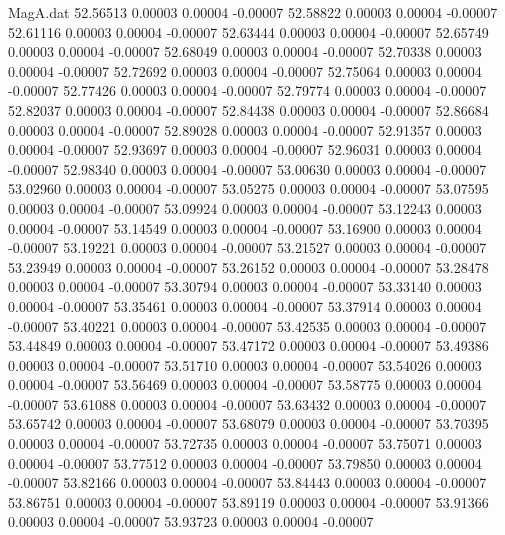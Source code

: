 \begin{filecontents}{MagA.dat}
  52.56513    0.00003    0.00004   -0.00007
  52.58822    0.00003    0.00004   -0.00007
  52.61116    0.00003    0.00004   -0.00007
  52.63444    0.00003    0.00004   -0.00007
  52.65749    0.00003    0.00004   -0.00007
  52.68049    0.00003    0.00004   -0.00007
  52.70338    0.00003    0.00004   -0.00007
  52.72692    0.00003    0.00004   -0.00007
  52.75064    0.00003    0.00004   -0.00007
  52.77426    0.00003    0.00004   -0.00007
  52.79774    0.00003    0.00004   -0.00007
  52.82037    0.00003    0.00004   -0.00007
  52.84438    0.00003    0.00004   -0.00007
  52.86684    0.00003    0.00004   -0.00007
  52.89028    0.00003    0.00004   -0.00007
  52.91357    0.00003    0.00004   -0.00007
  52.93697    0.00003    0.00004   -0.00007
  52.96031    0.00003    0.00004   -0.00007
  52.98340    0.00003    0.00004   -0.00007
  53.00630    0.00003    0.00004   -0.00007
  53.02960    0.00003    0.00004   -0.00007
  53.05275    0.00003    0.00004   -0.00007
  53.07595    0.00003    0.00004   -0.00007
  53.09924    0.00003    0.00004   -0.00007
  53.12243    0.00003    0.00004   -0.00007
  53.14549    0.00003    0.00004   -0.00007
  53.16900    0.00003    0.00004   -0.00007
  53.19221    0.00003    0.00004   -0.00007
  53.21527    0.00003    0.00004   -0.00007
  53.23949    0.00003    0.00004   -0.00007
  53.26152    0.00003    0.00004   -0.00007
  53.28478    0.00003    0.00004   -0.00007
  53.30794    0.00003    0.00004   -0.00007
  53.33140    0.00003    0.00004   -0.00007
  53.35461    0.00003    0.00004   -0.00007
  53.37914    0.00003    0.00004   -0.00007
  53.40221    0.00003    0.00004   -0.00007
  53.42535    0.00003    0.00004   -0.00007
  53.44849    0.00003    0.00004   -0.00007
  53.47172    0.00003    0.00004   -0.00007
  53.49386    0.00003    0.00004   -0.00007
  53.51710    0.00003    0.00004   -0.00007
  53.54026    0.00003    0.00004   -0.00007
  53.56469    0.00003    0.00004   -0.00007
  53.58775    0.00003    0.00004   -0.00007
  53.61088    0.00003    0.00004   -0.00007
  53.63432    0.00003    0.00004   -0.00007
  53.65742    0.00003    0.00004   -0.00007
  53.68079    0.00003    0.00004   -0.00007
  53.70395    0.00003    0.00004   -0.00007
  53.72735    0.00003    0.00004   -0.00007
  53.75071    0.00003    0.00004   -0.00007
  53.77512    0.00003    0.00004   -0.00007
  53.79850    0.00003    0.00004   -0.00007
  53.82166    0.00003    0.00004   -0.00007
  53.84443    0.00003    0.00004   -0.00007
  53.86751    0.00003    0.00004   -0.00007
  53.89119    0.00003    0.00004   -0.00007
  53.91366    0.00003    0.00004   -0.00007
  53.93723    0.00003    0.00004   -0.00007

\end{filecontents}
